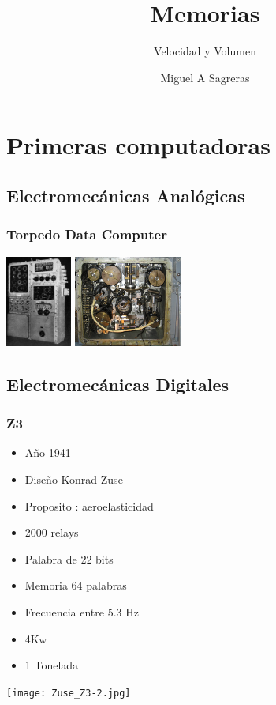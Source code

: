 \documentclass{beamer}
\title{Memorias}
\subtitle{Velocidad y Volumen}
\author[msagre]{Miguel A Sagreras}
\date[2015]{}
\begin{document}
\begin{frame}
\titlepage
\end{frame}

\section{Primeras computadoras}
\subsection{Electromecánicas Analógicas}
\begin{frame}
\frametitle{Torpedo Data Computer}
\begin{center}
\hfill
\includegraphics[height=3cm]{TDC-image.jpg}
\hfill
\includegraphics[height=3cm]{TDC-inside.jpg}
\end{center}
\end{frame}

\subsection{Electromecánicas Digitales}
\begin{frame}
\frametitle{Z3}
\begin{itemize}
	\item Año 1941
	\item Diseño Konrad Zuse
	\item Proposito : aeroelasticidad
	\item 2000 relays
	\item Palabra de 22 bits
	\item Memoria 64 palabras
	\item Frecuencia entre 5.3 Hz
	\item 4Kw
	\item 1 Tonelada
\end{itemize}
\begin{center}
\texttt{[image: Zuse\_Z3-2.jpg]}
\end{center}
\end{frame}
\end{document}
